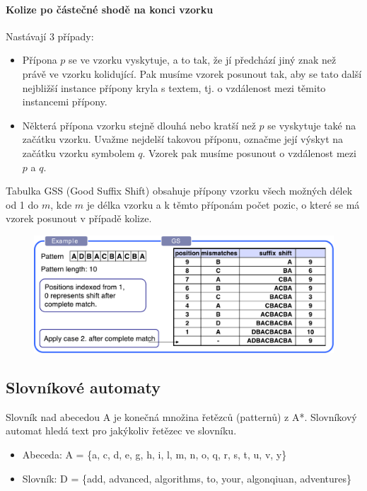 \paragraph{Kolize po částečné shodě na konci vzorku} Nastávají 3 případy:

\begin{itemize}
\item Přípona $p$ se ve vzorku vyskytuje, a to tak, že jí předchází jiný znak než právě ve vzorku kolidující. Pak musíme vzorek posunout tak, aby se tato další nejbližší instance přípony kryla s textem, tj. o vzdálenost mezi těmito instancemi přípony.
\item Některá přípona vzorku stejně dlouhá nebo kratší než $p$ se vyskytuje také na začátku vzorku. Uvažme nejdelší takovou příponu, označme její výskyt na začátku vzorku symbolem $q$. Vzorek pak musíme posunout o vzdálenost mezi $p$ a $q$.
\end{itemize}

Tabulka GSS (Good Suffix Shift) obsahuje přípony vzorku všech možných délek od 1 do $m$, kde $m$ je délka vzorku a k těmto příponám počet pozic, o které se má vzorek posunout v případě kolize.

\begin{figure}[h]
    \begin{center}
        \includegraphics[width=120mm]{spolecne/04/images/gss}
    \end{center}
\end{figure}


\subsection{Slovníkové automaty}
Slovník nad abecedou A je konečná množina řetězců (patternů) z A*. Slovníkový automat hledá text pro jakýkoliv řetězec ve slovníku.

\begin{itemize}
\item Abeceda: A = \{a, c, d, e, g, h, i, l, m, n, o, q, r, s, t, u, v, y\}
\item Slovník: D = \{add, advanced, algorithms, to, your, algonqiuan, adventures\}
\end{itemize}

